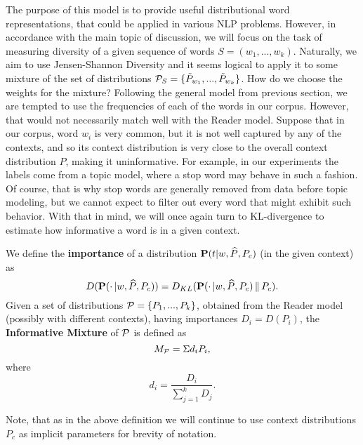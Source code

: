 The purpose of this model is to provide useful distributional
word representations, that could be applied in various NLP
problems. However, in accordance with the main topic of discussion, we will
focus on the task of measuring diversity of a given sequence of words
$S=(w_1,...,w_k)$. Naturally, we aim to use Jensen-Shannon Diversity
and it seems logical to apply it to some mixture of the set of
distributions ${\mathcal P}_S=\{\tilde{P}_{w_1},...,\tilde{P}_{w_k}\}$. How do we choose the weights
for the mixture? Following the general model from previous section, we
are tempted to use the frequencies of each of the words in our
corpus. However, that would not  
necessarily match well with the Reader model. Suppose that in our
corpus, word $w_i$ is very common, but it is not well captured by any of
the contexts, and so its context distribution is very close to the overall
context distribution $P$, making it uninformative. For example, in our
experiments the labels come from a topic model, where a stop word may
behave in such a fashion. Of course, that is why stop words are
generally removed from data before topic modeling, but we cannot
expect to filter out every word that might exhibit such behavior. With
that in mind, we will once again turn to KL-divergence to
estimate how informative a word is in a given context.

\bed\label{mixture}
We define the {\bf importance} of a distribution $\operatorname{\mathbf{P}}(t|w,\widehat{P},P_c)$ (in 
the given context) as
\[D(\operatorname{\mathbf{P}}(\cdot\,|w,\widehat{P},P_c)) =
D_{KL}(\operatorname{\mathbf{P}}(\cdot\,|w,\widehat{P},P_c)\,\|\,P_c).\]
Given a set of distributions ${\mathcal P} = \{P_1,...,P_k\}$, obtained from the
Reader model (possibly with different contexts), having importances
$D_i=D(P_i)$, the {\bf Informative Mixture} of ${\mathcal P}$ is defined as
\[M_{{\mathcal P}} = \Sigma d_i P_i,\]
where
\[d_i = \frac{D_i}{\sum_{j=1}^k D_j}.\]
\eed

Note, that as in the above definition we will continue to use context
distributions $P_c$ as implicit parameters for brevity of notation.  

